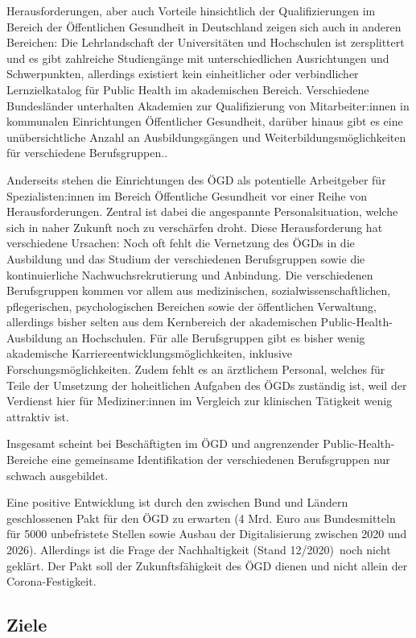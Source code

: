 \documentclass{article}
\begin{document}
Herausforderungen, aber auch Vorteile hinsichtlich der Qualifizierungen im Bereich der Öffentlichen Gesundheit in Deutschland zeigen sich auch in anderen Bereichen: Die Lehrlandschaft der Universitäten und Hochschulen ist zersplittert und es gibt zahlreiche Studiengänge mit unterschiedlichen Ausrichtungen und Schwerpunkten, allerdings existiert kein einheitlicher oder verbindlicher Lernzielkatalog für Public Health im akademischen Bereich. Verschiedene Bundesländer unterhalten Akademien zur Qualifizierung von Mitarbeiter:innen in kommunalen Einrichtungen Öffentlicher Gesundheit, darüber hinaus gibt es eine unübersichtliche Anzahl an Ausbildungsgängen und Weiterbildungsmöglichkeiten für verschiedene Berufsgruppen.. 


Anderseits stehen die Einrichtungen des ÖGD als potentielle Arbeitgeber für Spezialisten:innen im Bereich Öffentliche Gesundheit vor einer Reihe von Herausforderungen. Zentral ist dabei die angespannte Personalsituation, welche sich in naher Zukunft noch zu verschärfen droht. Diese Herausforderung hat verschiedene Ursachen: Noch oft fehlt die Vernetzung des ÖGDs in die Ausbildung und das Studium der verschiedenen Berufsgruppen sowie die kontinuierliche Nachwuchsrekrutierung und Anbindung. Die verschiedenen Berufsgruppen kommen vor allem aus medizinischen, sozialwissenschaftlichen, pflegerischen, psychologischen Bereichen sowie der öffentlichen Verwaltung, allerdings bisher selten aus dem Kernbereich der akademischen Public-Health-Ausbildung an Hochschulen. Für alle Berufsgruppen gibt es bisher wenig akademische Karriereentwicklungsmöglichkeiten, inklusive Forschungsmöglichkeiten. Zudem fehlt es an ärztlichem Personal, welches für Teile der Umsetzung der hoheitlichen Aufgaben des ÖGDs zuständig ist, weil der Verdienst hier für Mediziner:innen im Vergleich zur klinischen Tätigkeit wenig attraktiv ist.


Insgesamt scheint bei Beschäftigten im ÖGD und angrenzender Public-Health-Bereiche eine gemeinsame Identifikation der verschiedenen Berufsgruppen nur schwach ausgebildet.


Eine positive Entwicklung ist durch den zwischen Bund und Ländern geschlossenen Pakt für den ÖGD zu erwarten (4 Mrd. Euro aus Bundesmitteln für 5000 unbefristete Stellen sowie Ausbau der Digitalisierung zwischen 2020 und 2026). Allerdings ist die Frage der Nachhaltigkeit (Stand 12/2020) noch nicht geklärt. Der Pakt soll der Zukunftsfähigkeit des ÖGD dienen und nicht allein der Corona-Festigkeit.


\subsection{Ziele }\label{H8508372}
\end{document}
